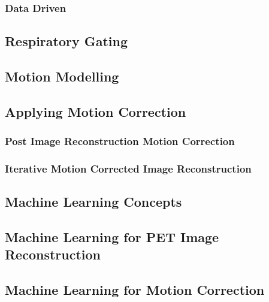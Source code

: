                
            \subsubsection{Data Driven} \label{sec:data_driven}
                
                
        \subsection{Respiratory Gating} \label{sec:respiratory_gating}
            
            
        \subsection{Motion Modelling} \label{sec:motion_modelling}
            
        
        \subsection{Applying Motion Correction} \label{sec:applying_motion_correction}
            
            
            \subsubsection{Post Image Reconstruction Motion Correction} \label{sec:post_image_reconstruction_motion_correction}
                
                
            \subsubsection{Iterative Motion Corrected Image Reconstruction} \label{sec:iterative_motion_corrected_image_reconstruction}
                
    
        
        
        \subsection{Machine Learning Concepts} \label{sec:machine_learning_concepts}
            
        
        \subsection{Machine Learning for PET Image Reconstruction} \label{sec:machine_learning_for_pet_image_reconstruction}
            
        
        \subsection{Machine Learning for Motion Correction} \label{sec:machine_learning_for_motion_correction}
            
